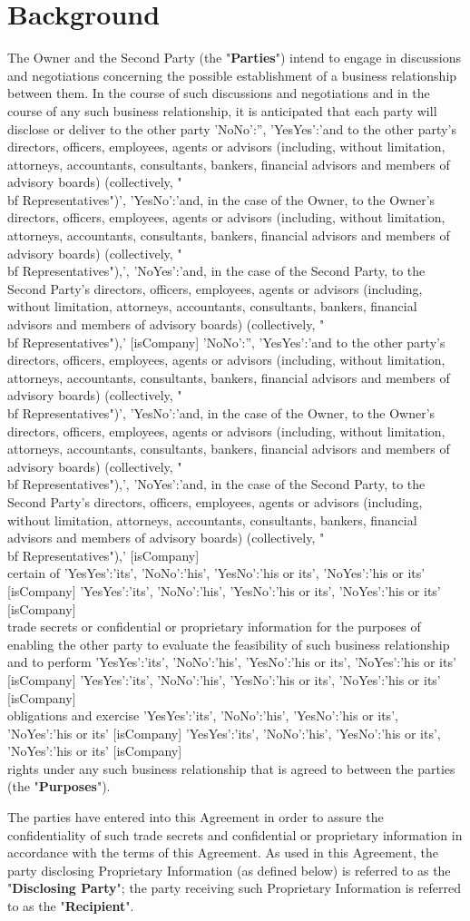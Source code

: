 \documentclass[10pt]{article}
\makeatletter
\edef\history{ }
\newcommand{\VAR}[1]{{\color{blue} #1}\g@addto@macro\history{#1\\}}
\newcommand{\pronouns}{
    \VAR{
        {
            'YesYes':'its',
            'NoNo':'his',
            'YesNo':'his or its',
            'NoYes':'his or its'
        }[isCompany]
    }
}
\makeatother
\begin{document}
\section{Background}
The Owner and the Second Party (the "{\bf Parties}") intend to engage in discussions and negotiations concerning the possible establishment of a business relationship between them.  In the course of such discussions and negotiations and in the course of any such business relationship, it is anticipated that each party will disclose or deliver to the other party
 \VAR{
    {
        'NoNo':'',
        'YesYes':'and to the other party’s directors, officers, employees, agents or advisors (including, without limitation, attorneys, accountants, consultants, bankers, financial advisors and members of advisory boards) (collectively, "{\\bf Representatives}")',
        'YesNo':'and, in the case of the Owner, to the Owner’s directors, officers, employees, agents or advisors (including, without limitation, attorneys, accountants, consultants, bankers, financial advisors and members of advisory boards) (collectively, "{\\bf Representatives}"),',
        'NoYes':'and, in the case of the Second Party, to the Second Party’s directors, officers, employees, agents or advisors (including, without limitation, attorneys, accountants, consultants, bankers, financial advisors and members of advisory boards) (collectively, "{\\bf Representatives}"),'
    }[isCompany]
}
certain of \pronouns trade secrets or confidential or proprietary information for the purposes of enabling the other party to evaluate the feasibility of such business relationship and to perform \pronouns obligations and exercise \pronouns rights under any such business relationship that is agreed to between the parties (the "{\bf Purposes}").

The parties have entered into this Agreement in order to assure the confidentiality of such trade secrets and confidential or proprietary information in accordance with the terms of this Agreement.  As used in this Agreement, the party disclosing Proprietary Information (as defined below) is referred to as the "{\bf Disclosing Party}"; the party receiving such Proprietary Information is referred to as the "{\bf Recipient}".
\end{document}
